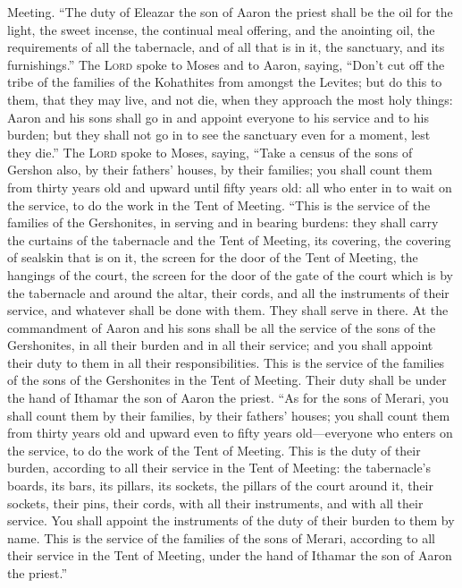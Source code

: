 Meeting.  ``The duty of Eleazar the son of Aaron the
priest shall be the oil for the light, the sweet incense, the continual
meal offering, and the anointing oil, the requirements of all the
tabernacle, and of all that is in it, the sanctuary, and its
furnishings.''  The \textsc{Lord} spoke to Moses and to
Aaron, saying,  ``Don't cut off the tribe of the families
of the Kohathites from amongst the Levites;  but do this
to them, that they may live, and not die, when they approach the most
holy things: Aaron and his sons shall go in and appoint everyone to his
service and to his burden;  but they shall not go in to
see the sanctuary even for a moment, lest they die.'' 
The \textsc{Lord} spoke to Moses, saying,  ``Take a
census of the sons of Gershon also, by their fathers' houses, by their
families;  you shall count them from thirty years old and
upward until fifty years old: all who enter in to wait on the service,
to do the work in the Tent of Meeting.  ``This is the
service of the families of the Gershonites, in serving and in bearing
burdens:  they shall carry the curtains of the tabernacle
and the Tent of Meeting, its covering, the covering of sealskin that is
on it, the screen for the door of the Tent of Meeting, 
the hangings of the court, the screen for the door of the gate of the
court which is by the tabernacle and around the altar, their cords, and
all the instruments of their service, and whatever shall be done with
them. They shall serve in there.  At the commandment of
Aaron and his sons shall be all the service of the sons of the
Gershonites, in all their burden and in all their service; and you shall
appoint their duty to them in all their responsibilities.
 This is the service of the families of the sons of the
Gershonites in the Tent of Meeting. Their duty shall be under the hand
of Ithamar the son of Aaron the priest.  ``As for the
sons of Merari, you shall count them by their families, by their
fathers' houses;  you shall count them from thirty years
old and upward even to fifty years old---everyone who enters on the
service, to do the work of the Tent of Meeting.  This is
the duty of their burden, according to all their service in the Tent of
Meeting: the tabernacle's boards, its bars, its pillars, its sockets,
 the pillars of the court around it, their sockets, their
pins, their cords, with all their instruments, and with all their
service. You shall appoint the instruments of the duty of their burden
to them by name.  This is the service of the families of
the sons of Merari, according to all their service in the Tent of
Meeting, under the hand of Ithamar the son of Aaron the priest.''

